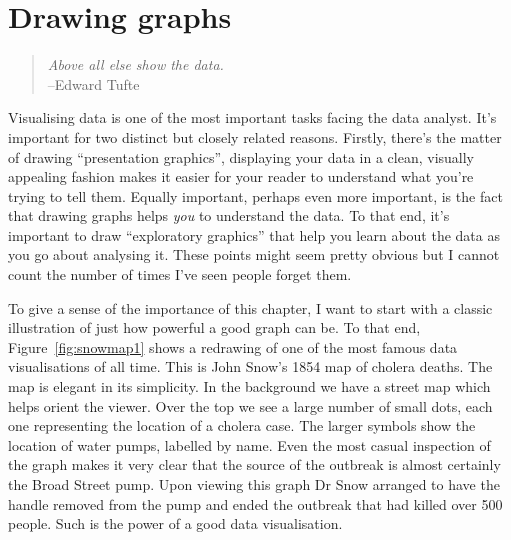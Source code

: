 

\chapter{Drawing graphs\label{ch:graphics}}

\begin{quote}
{\it Above all else show the data.} \\
\hspace*{2cm} --Edward Tufte
\end{quote}

Visualising data is one of the most important tasks facing the data analyst. It's important for two distinct but closely related reasons. Firstly, there's the matter of drawing ``presentation graphics'', displaying your data in a clean, visually appealing fashion makes it easier for your reader to understand what you're trying to tell them. Equally important, perhaps even more important, is the fact that drawing graphs helps {\it you} to understand the data. To that end, it's important to draw ``exploratory graphics'' that help you learn about the data as you go about analysing it. These points might seem pretty obvious but I cannot count the number of times I've seen people forget them. 

To give a sense of the importance of this chapter, I want to start with a classic illustration of just how powerful a good graph can be. To that end, Figure~\ref{fig:snowmap1} shows a redrawing of one of the most famous data visualisations of all time. This is John Snow's 1854 map of cholera deaths. The map is elegant in its simplicity. In the background we have a street map which helps orient the viewer. Over the top we see a large number of small dots, each one representing the location of a cholera case. The larger symbols show the location of water pumps, labelled by name. Even the most casual inspection of the graph makes it very clear that the source of the outbreak is almost certainly the Broad Street pump. Upon viewing this graph Dr Snow arranged to have the handle removed from the pump and ended the outbreak that had killed over 500 people. Such is the power of a good data visualisation.

